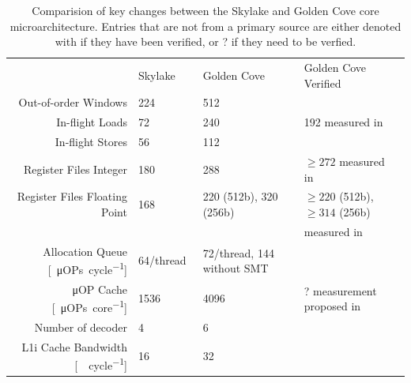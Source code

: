 \begin{table}
	\centering
	\caption{\label{tab:micro-arch-params}Comparision of key changes between the Skylake and Golden Cove core microarchitecture. Entries that are not from a primary source are either denoted with \checkmark if they have been verified, or ? if they need to be verfied.}
	\begin{tabular}{r|lll}
		\toprule
			&	Skylake & Golden Cove & Golden Cove Verified \\
		\rowcolor[HTML]{EFEFEF}Out-of-order Windows		& 224~\cite{Intel_2017_Skylake_SP} & 512~\cite{Intel_2021_Architecture_Day,ServerTheHome_2023_SPR_Press,Wccftech_2023_SPR_Press} & \checkmark~\figref{robsize-reorder} \\
		In-flight Loads & 72~\cite{Intel_2017_Skylake_SP} & 240~\cite{ServerTheHome_2023_SPR_Press,Wccftech_2023_SPR_Press} & 192 measured in~\figref{robsize-load} \\
		\rowcolor[HTML]{EFEFEF}In-flight Stores & 56~\cite{Intel_2017_Skylake_SP} & 112~\cite{ServerTheHome_2023_SPR_Press,Wccftech_2023_SPR_Press} & \checkmark~\figref{robsize-store} \\
		Register Files Integer & 180~\cite{Intel_2017_Skylake_SP} & 288~\cite{ServerTheHome_2023_SPR_Press,Wccftech_2023_SPR_Press} & $\geq 272$ measured in~\figref{robsize-registers} \\
		\rowcolor[HTML]{EFEFEF}Register Files Floating Point & 168~\cite{Intel_2017_Skylake_SP} & 220 (512b), 320 (256b)~\cite{ServerTheHome_2023_SPR_Press,Wccftech_2023_SPR_Press} & $\geq 220$ (512b), $\geq 314$ (256b) \\
		\rowcolor[HTML]{EFEFEF} & & & measured in~\figref{robsize-registers} \\
		Allocation Queue [\SI{}{\micro OPs\per cycle}]& 64/thread~\cite{Intel_2017_Skylake_SP} & 72/thread, 144 without SMT~\cite{Intel_2021_Architecture_Day,ServerTheHome_2023_SPR_Press,Wccftech_2023_SPR_Press,Intel_Optimization_Reference_Manual_050} & \\
		\rowcolor[HTML]{EFEFEF}μOP Cache [\SI{}{\micro OPs\per core}] & \SI{1536}{}~\cite{Wikichip_SkylakeSP} & \SI{4096}{}~\cite{Intel_2021_Architecture_Day} & ? measurement proposed in~\cite{Schoene_2021_FIRESTARTER2} \\
		Number of decoder & \SI{4}{}~\cite{Wikichip_SkylakeSP} & \SI{6}{}~\cite{Intel_2021_Architecture_Day,Intel_Optimization_Reference_Manual_050} & \\
		\rowcolor[HTML]{EFEFEF}L1i Cache Bandwidth [\SI{}{\byte\per cycle}] & \SI{16}{}~\cite{Wikichip_SkylakeSP} & \SI{32}{}~\cite{Intel_Optimization_Reference_Manual_050} & \\

\end{tabular}
\end{table}
